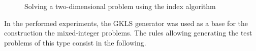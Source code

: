 \documentclass{llncs}
\begin{document}
\begin{figure}
\begin{minipage}{0.5\linewidth}
\end{minipage}
\caption{Solving a two-dimensional problem using the index algorithm}
\label{example}
\end{figure}

In the performed experiments, the GKLS generator was used as a base for the construction the 
mixed-integer problems. The rules allowing generating the test problems of this type consist in 
the following.
\end{document}
